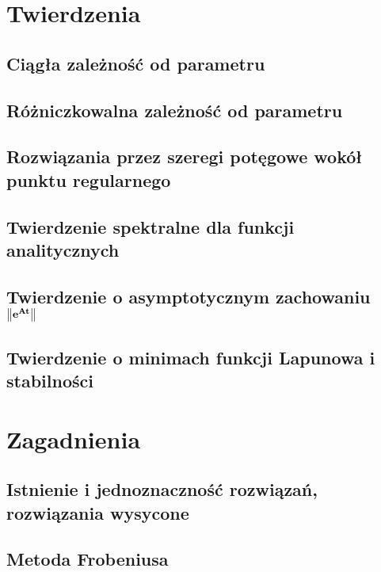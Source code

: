 



  \maketitle
  
  \tableofcontents
  
  \chapter{Twierdzenia}
    \section{Ciągła zależność od parametru}
      
    \section{Różniczkowalna zależność od parametru}
      
    \section{Rozwiązania przez szeregi potęgowe wokół punktu regularnego}
      
    \section{Twierdzenie spektralne dla funkcji analitycznych}
      
    \section{Twierdzenie o asymptotycznym zachowaniu $\mathbf{\norm*{e^{At}}}$}
    \section{Twierdzenie o minimach funkcji Lapunowa i stabilności}
    
  \chapter{Zagadnienia}
    \section{Istnienie i jednoznaczność rozwiązań, rozwiązania wysycone}
      
    \section{Metoda Frobeniusa}
